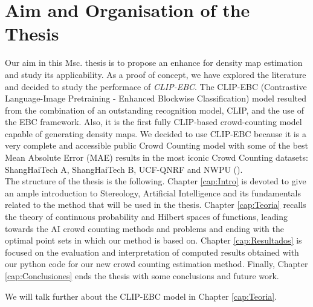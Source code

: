 \section{Aim and Organisation of the Thesis}


Our aim in this Msc. thesis is to propose an enhance for density map estimation and study its applicability. As a proof of concept, we have explored the literature and decided to study the performace of  \emph{CLIP-EBC}.
The CLIP-EBC (Contrastive Language-Image Pretraining - Enhanced Blockwise Classification) model resulted from the combination of an outstanding recognition model, CLIP, and the use of the EBC framework. Also, it is the first fully CLIP-based crowd-counting model capable of generating density maps. We decided to use CLIP-EBC because it is a very complete and accessible public Crowd Counting model with some of the best Mean Absolute Error (MAE) results in the most iconic Crowd Counting datasets: ShangHaiTech A, ShangHaiTech B, UCF-QNRF and NWPU (\cite{CLIP}). \\

The structure of the thesis is the following. Chapter \ref{cap:Intro} is devoted to give an ample introduction to Stereology, Artificial Intelligence and its fundamentals related to the method that will be used in the thesis. Chapter \ref{cap:Teoria} recalls the theory of continuous probability and Hilbert spaces of functions, leading towards the AI crowd counting methods and problems and ending with the optimal point sets in which our method is based on. Chapter \ref{cap:Resultados} is focused on the evaluation and interpretation of computed results obtained with our python code for our new crowd counting estimation method. Finally, Chapter \ref{cap:Conclusiones} ends the thesis with some conclusions and future work.

We will talk further about the CLIP-EBC model in Chapter \ref{cap:Teoria}.\\






